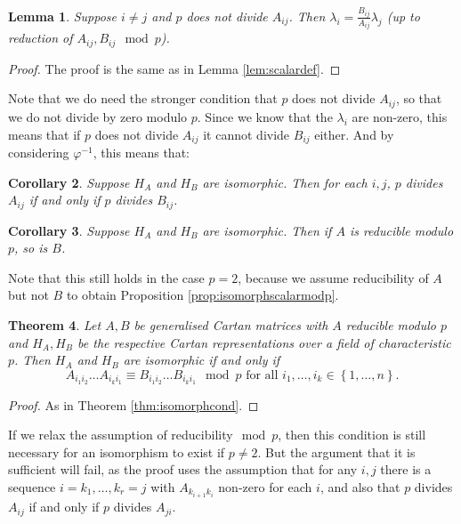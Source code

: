 \documentclass[11pt,a4paper]{report}
\newtheorem{theorem}{Theorem}[chapter]
\newtheorem{lemma}[theorem]{Lemma}
\newtheorem{corollary}[theorem]{Corollary}
\theoremstyle{definition}
\begin{document}
\begin{lemma} \label{lem:scalardefmodp} Suppose $i \neq j$ and $p$ does not divide $A_{ij}$. Then $\lambda_i = \frac{B_{ij}}{A_{ij}} \lambda_j$ (up to reduction of $A_{ij}, B_{ij} \mod p$). 
\end{lemma}

\begin{proof}
    The proof is the same as in Lemma \ref{lem:scalardef}.
\end{proof}

Note that we do need the stronger condition that $p$ does not divide $A_{ij}$, so that we do not divide by zero modulo $p$. Since we know that the $\lambda_i$ are non-zero, this means that if $p$ does not divide $A_{ij}$ it cannot divide $B_{ij}$ either. And by considering $\varphi^{-1}$, this means that:

\begin{corollary}
\label{cor:divisiblecond}
    Suppose $H_A$ and $H_B$ are isomorphic. Then for each $i, j$, $p$ divides $A_{ij}$ if and only if $p$ divides $B_{ij}$.
\end{corollary}

\begin{corollary}
    Suppose $H_A$ and $H_B$ are isomorphic. Then if $A$ is reducible modulo $p$, so is $B$. 
\end{corollary}

Note that this still holds in the case $p = 2$, because we assume reducibility of $A$ but not $B$ to obtain Proposition \ref{prop:isomorphscalarmodp}.

\begin{theorem}Let $A, B$ be generalised Cartan matrices with $A$ reducible modulo $p$ and $H_A, H_B$ be the respective Cartan representations over a field of characteristic $p$. Then $H_A$ and $H_B$ are isomorphic if and only if \begin{equation*}A_{i_1i_2} \ldots A_{i_{k} i_1} \equiv B_{i_1i_2} \ldots B_{i_ki_1} \mod p \text{ for all } i_1, \ldots , i_k \in \left\{1, \ldots, n\right\}.\end{equation*}  
\end{theorem}

\begin{proof}
As in Theorem \ref{thm:isomorphcond}.
\end{proof}

If we relax the assumption of reducibility$\mod p$, then this condition is still necessary for an isomorphism to exist if $p \neq 2$. But the argument that it is sufficient will fail, as the proof uses the assumption that for any $i, j$ there is a sequence $i = k_1, \ldots, k_r = j$ with $A_{k_{i+1} k_i}$ non-zero for each $i$, and also that $p$ divides $A_{ij}$ if and only if $p$ divides $A_{ji}$. 
\end{document}
